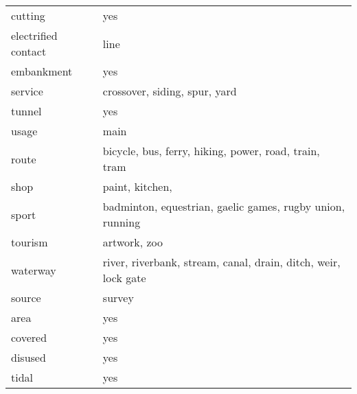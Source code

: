 \documentclass[]{elsarticle} %
\begin{document}
\begin{table}[t]
\begin{tabular}{l>{\raggedright\arraybackslash}p{3in}}
cutting & yes\\
electrified contact & line\\
embankment & yes\\
service & crossover, siding, spur, yard\\
tunnel & yes\\
usage & main\\
route & bicycle, bus, ferry, hiking, power, road, train, tram\\
shop & paint, kitchen,\\
sport & badminton, equestrian, gaelic games, rugby union, running\\
tourism & artwork, zoo\\
waterway & river, riverbank, stream, canal, drain, ditch, weir, lock gate\\
source & survey\\
area & yes\\
covered & yes\\
disused & yes\\
tidal & yes\\
\bottomrule
\end{tabular}
\end{table}
\end{document}
